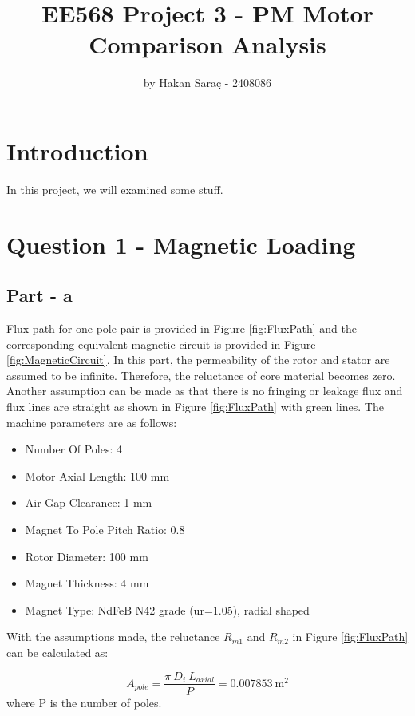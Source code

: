 \documentclass{article}
\title{EE568 Project 3 - PM Motor Comparison Analysis}
\author{by Hakan Saraç - 2408086}
\date{}
\begin{document}
\maketitle

\newpage
\section{Introduction}
In this project, we will examined some stuff.

\section{Question 1 - Magnetic Loading}
\subsection{Part - a}

Flux path for one pole pair is provided in Figure \ref{fig:FluxPath} and the corresponding equivalent magnetic circuit is provided in Figure \ref{fig:MagneticCircuit}. In this part, the permeability of the rotor and stator are assumed to be infinite. Therefore, the reluctance of core material becomes zero. Another assumption can be made as that there is no fringing or leakage flux and flux lines are straight as shown in Figure \ref{fig:FluxPath} with green lines. \newline
The machine parameters are as follows:
\begin{itemize}
    \item Number Of Poles: 4
    \item Motor Axial Length: 100 mm
    \item Air Gap Clearance: 1 mm
    \item Magnet To Pole Pitch Ratio: 0.8
    \item Rotor Diameter: 100 mm
    \item Magnet Thickness: 4 mm
    \item Magnet Type: NdFeB N42 grade (ur=1.05), radial shaped
\end{itemize} 
\bigskip
\noindent With the assumptions made, the reluctance $R_{m1}$ and $R_{m2}$ in Figure \ref{fig:FluxPath} can be calculated as:

\begin{equation} \label{eqn:PoleAreaFormula}
    A_{pole} = \frac{\pi \: D_i \: L_{axial}}{P}=0.007853 \: \mathrm{m^2}
\end{equation}
where P is the number of poles.

\bigskip
\end{document}
